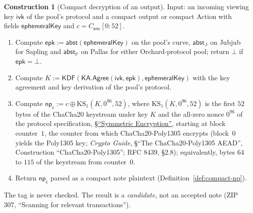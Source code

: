 \documentclass[11pt,a4paper]{article}
\theoremstyle{definition}
\newtheorem{construction}[theorem]{Construction}
\newcommand{\PP}{\mathbb{P}}
\newcommand{\ivk}{\ensuremath{\mathsf{ivk}}}
\begin{document}
\begin{construction}[Compact decryption of an output]\label{def:compact-trial}
Input: an incoming viewing key $\ivk$ of the pool's protocol and a compact
output or compact Action with fields $\mathsf{ephemeralKey}$ and
$c = C_{\mathsf{enc}}[0{:}52]$.
\begin{enumerate}
\item Compute $\mathsf{epk} := \mathsf{abst}(\mathsf{ephemeralKey})$ on the
  pool's curve, $\mathsf{abst}_{\mathbb{J}}$ on Jubjub for Sapling and
  $\mathsf{abst}_{\PP}$ on Pallas for either Orchard-protocol pool; return
  $\bot$ if $\mathsf{epk} = \bot$.
\item Compute $K := \mathsf{KDF}(\mathsf{KA.Agree}(\ivk, \mathsf{epk}),
  \mathsf{ephemeralKey})$ with the key agreement and key derivation of the
  pool's protocol.
\item Compute $\mathsf{np}_{\mathsf{c}} := c \oplus
  \mathrm{KS}_1(K, 0^{96}, 52)$, where $\mathrm{KS}_1(K, 0^{96}, 52)$ is the
  first $52$ bytes of the ChaCha20 keystream under key $K$ and the
  all-zero nonce $0^{96}$ of the protocol specification,
  \href{https://zips.z.cash/protocol/protocol.pdf\#concretesym}{\S``Symmetric
  Encryption''}, starting at block counter~$1$, the counter from which
  ChaCha20-Poly1305 encrypts (block~$0$ yields the Poly1305 key;
  \emph{Crypto Guide}, \S``The ChaCha20-Poly1305 AEAD'', Construction
  ``ChaCha20-Poly1305''; RFC 8439, \S2.8); equivalently, bytes $64$ to
  $115$ of the keystream from counter~$0$.
\item Return $\mathsf{np}_{\mathsf{c}}$ parsed as a compact note plaintext
  (Definition~\ref{def:compact-np}).
\end{enumerate}
The tag is never checked. The result is a \emph{candidate}, not an accepted
note (ZIP 307, ``Scanning for relevant transactions'').
\end{construction}
\end{document}
